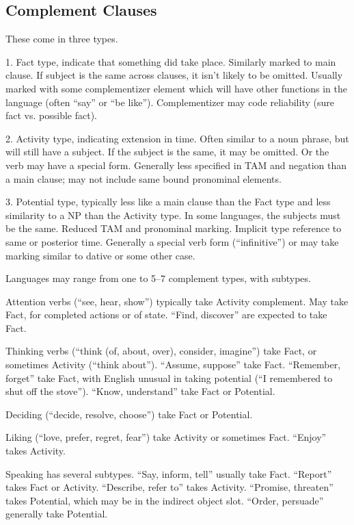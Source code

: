 \documentclass[11pt]{article}
\begin{document}
{\subsection{Complement Clauses}
These come in three types.

1.  Fact type, indicate that something did take place.  Similarly
marked to main clause.  If subject is the same across clauses, it
isn't likely to be omitted.  Usually marked with some complementizer
element which will have other functions in the language (often ``say''
or ``be like'').  Complementizer may code reliability (sure fact
vs. possible fact).

2. Activity type, indicating extension in time.  Often similar to a
noun phrase, but will still have a subject.  If the subject is the
same, it may be omitted.  Or the verb may have a special form.
Generally less specified in TAM and negation than a main clause; may
not include same bound pronominal elements.

3. Potential type, typically less like a main clause than the Fact
type and less similarity to a NP than the Activity type.  In some
languages, the subjects must be the same.  Reduced TAM and pronominal
marking.  Implicit type reference to same or posterior time.
Generally a special verb form (``infinitive'') or may take marking
similar to dative or some other case.

Languages may range from one to 5--7 complement types, with subtypes.

Attention verbs (``see, hear, show'') typically take Activity
complement.  May take Fact, for completed actions or of state.
``Find, discover'' are expected to take Fact.

Thinking verbs (``think (of, about, over), consider, imagine'') take
Fact, or sometimes Activity (``think about'').  ``Assume, suppose''
take Fact.  ``Remember, forget'' take Fact, with English unusual in
taking potential (``I remembered to shut off the stove'').  ``Know,
understand'' take Fact or Potential.

Deciding (``decide, resolve, choose'') take Fact or Potential.

Liking (``love, prefer, regret, fear'') take Activity or sometimes
Fact.  ``Enjoy'' takes Activity.

Speaking has several subtypes.  ``Say, inform, tell'' usually take
Fact.  ``Report'' takes Fact or Activity.  ``Describe, refer to''
takes Activity.  ``Promise, threaten'' takes Potential, which may be
in the indirect object slot.  ``Order, persuade'' generally take
Potential. 

}
\end{document}
